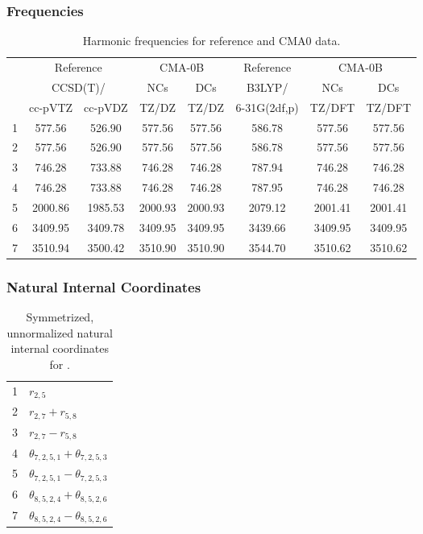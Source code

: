\documentclass[10pt,oneside]{article}
\begin{document}
\subsubsection*{Frequencies}
\begin{table}[h!]
\centering
\caption{Harmonic frequencies for reference and CMA0 data.}
\begin{tabular}{cccccccc}
\toprule
{} & \multicolumn{2}{c}{Reference} & \multicolumn{2}{c}{CMA-0B} &    Reference & \multicolumn{2}{c}{CMA-0B} \\
{} & \multicolumn{2}{c}{CCSD(T)/} &     NCs &     DCs &       B3LYP/ &     NCs &     DCs \\
{} &   cc-pVTZ & cc-pVDZ &   TZ/DZ &   TZ/DZ & 6-31G(2df,p) &  TZ/DFT &  TZ/DFT \\
\midrule
1 &    577.56 &  526.90 &  577.56 &  577.56 &       586.78 &  577.56 &  577.56 \\
2 &    577.56 &  526.90 &  577.56 &  577.56 &       586.78 &  577.56 &  577.56 \\
3 &    746.28 &  733.88 &  746.28 &  746.28 &       787.94 &  746.28 &  746.28 \\
4 &    746.28 &  733.88 &  746.28 &  746.28 &       787.95 &  746.28 &  746.28 \\
5 &   2000.86 & 1985.53 & 2000.93 & 2000.93 &      2079.12 & 2001.41 & 2001.41 \\
6 &   3409.95 & 3409.78 & 3409.95 & 3409.95 &      3439.66 & 3409.95 & 3409.95 \\
7 &   3510.94 & 3500.42 & 3510.90 & 3510.90 &      3544.70 & 3510.62 & 3510.62 \\
\bottomrule
\end{tabular}
\end{table}

\clearpage

\subsubsection*{Natural Internal Coordinates}
\begin{table}[h!]
\centering
\caption{Symmetrized, unnormalized natural internal coordinates for .}
\small
\begin{tabular}{ll}
  1   & $r_{2,5}$ \\
  2   & $r_{2,7} + r_{5,8}$ \\
  3   & $r_{2,7} - r_{5,8}$ \\
  4   & $\theta_{7,2,5,1} + \theta_{7,2,5,3}$ \\
  5   & $\theta_{7,2,5,1} - \theta_{7,2,5,3}$ \\
  6   & $\theta_{8,5,2,4} + \theta_{8,5,2,6}$ \\
  7   & $\theta_{8,5,2,4} - \theta_{8,5,2,6}$ \\
\end{tabular}
\end{table}
\end{document}
